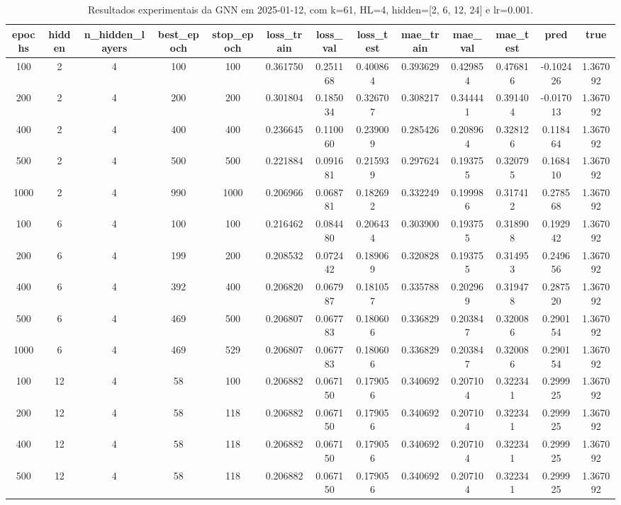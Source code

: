 \begin{table}[h]
\centering
\caption{Resultados experimentais da GNN em 2025-01-12, com k=61, HL=4, hidden=[2, 6, 12, 24] e lr=0.001.}
\label{tab:gnn_results_k61_hl4_d20250112}
\begin{tabular}{ccccccccccccc}
\toprule
epochs & hidden & n\_hidden\_layers & best\_epoch & stop\_epoch & loss\_train & loss\_val & loss\_test & mae\_train & mae\_val & mae\_test & pred & true \\
\midrule
100 & 2 & 4 & 100 & 100 & 0.361750 & 0.251168 & 0.400864 & 0.393629 & 0.429854 & 0.476816 & -0.102426 & 1.367092 \\
200 & 2 & 4 & 200 & 200 & 0.301804 & 0.185034 & 0.326707 & 0.308217 & 0.344441 & 0.391404 & -0.017013 & 1.367092 \\
400 & 2 & 4 & 400 & 400 & 0.236645 & 0.110060 & 0.239009 & 0.285426 & 0.208964 & 0.328126 & 0.118464 & 1.367092 \\
500 & 2 & 4 & 500 & 500 & 0.221884 & 0.091681 & 0.215939 & 0.297624 & 0.193755 & 0.320795 & 0.168410 & 1.367092 \\
1000 & 2 & 4 & 990 & 1000 & 0.206966 & 0.068781 & 0.182692 & 0.332249 & 0.199986 & 0.317412 & 0.278568 & 1.367092 \\
100 & 6 & 4 & 100 & 100 & 0.216462 & 0.084480 & 0.206434 & 0.303900 & 0.193755 & 0.318908 & 0.192942 & 1.367092 \\
200 & 6 & 4 & 199 & 200 & 0.208532 & 0.072442 & 0.189069 & 0.320828 & 0.193755 & 0.314953 & 0.249656 & 1.367092 \\
400 & 6 & 4 & 392 & 400 & 0.206820 & 0.067987 & 0.181057 & 0.335788 & 0.202969 & 0.319478 & 0.287520 & 1.367092 \\
500 & 6 & 4 & 469 & 500 & 0.206807 & 0.067783 & 0.180606 & 0.336829 & 0.203847 & 0.320086 & 0.290154 & 1.367092 \\
1000 & 6 & 4 & 469 & 529 & 0.206807 & 0.067783 & 0.180606 & 0.336829 & 0.203847 & 0.320086 & 0.290154 & 1.367092 \\
100 & 12 & 4 & 58 & 100 & 0.206882 & 0.067150 & 0.179056 & 0.340692 & 0.207104 & 0.322341 & 0.299925 & 1.367092 \\
200 & 12 & 4 & 58 & 118 & 0.206882 & 0.067150 & 0.179056 & 0.340692 & 0.207104 & 0.322341 & 0.299925 & 1.367092 \\
400 & 12 & 4 & 58 & 118 & 0.206882 & 0.067150 & 0.179056 & 0.340692 & 0.207104 & 0.322341 & 0.299925 & 1.367092 \\
500 & 12 & 4 & 58 & 118 & 0.206882 & 0.067150 & 0.179056 & 0.340692 & 0.207104 & 0.322341 & 0.299925 & 1.367092 \\

\end{tabular}
\end{table}
